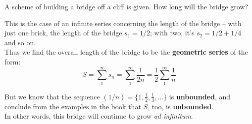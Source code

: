 \documentclass[boxes, qed]{homework}
\begin{document}
\begin{problem}A scheme of building a bridge off a cliff is given. How long will the bridge grow?
\end{problem}
\begin{solution}This is the case of an infinite series concerning the length of the bridge – 
  with just one brick, the length of the bridge $s_1=1/2$; with two, it's $s_2=1/2+1/4$
  and so on.\\
  
  Thus we find the overall length of the bridge to be the \textbf{geometric series} of the form:
  $$S
    =\sum_{1}^{\infty}{s_n}
    =\sum_{1}^{\infty}{\frac{1}{2n}}
    =\frac{1}{2}\sum_{1}^{\infty}{\frac{1}{n}}
  $$

  But we know that the sequence $(1/n)=\{1,\frac{1}{2},\frac{1}{3},\dots\}$ is \textbf{unbounded}, and conclude from the examples in the book that
  $S$, too, is \textbf{unbounded}.\\

  In other words, this bridge will continue to grow \textit{ad infinitum}.
\end{solution}
\end{document}
